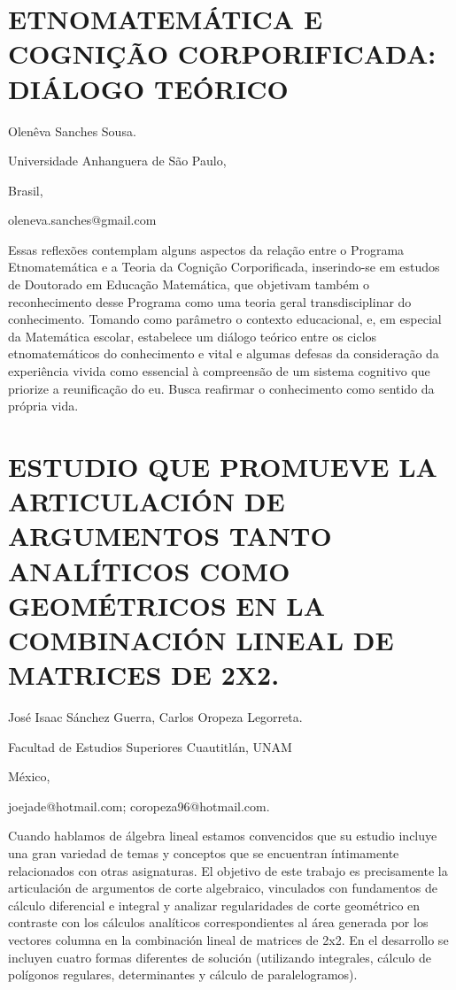 \section{ETNOMATEMÁTICA E COGNIÇÃO CORPORIFICADA: DIÁLOGO TEÓRICO}

\begin{datos}

Olenêva Sanches Sousa.

Universidade Anhanguera de São Paulo,

Brasil,

oleneva.sanches@gmail.com

\end{datos}

Essas reflexões contemplam alguns aspectos da relação entre o Programa
Etnomatemática e a Teoria da Cognição Corporificada, inserindo-se
em estudos de Doutorado em Educação Matemática, que objetivam também
o reconhecimento desse Programa como uma teoria geral transdisciplinar
do conhecimento. Tomando como parâmetro o contexto educacional, e,
em especial da Matemática escolar, estabelece um diálogo teórico entre
os ciclos etnomatemáticos do conhecimento e vital e algumas defesas
da consideração da experiência vivida como essencial à compreensão
de um sistema cognitivo que priorize a reunificação do eu. Busca reafirmar
o conhecimento como sentido da própria vida.


\section{ESTUDIO QUE PROMUEVE LA ARTICULACIÓN DE ARGUMENTOS TANTO ANALÍTICOS
COMO GEOMÉTRICOS EN LA COMBINACIÓN LINEAL DE MATRICES DE 2X2.}

\begin{datos}

José Isaac Sánchez Guerra, Carlos Oropeza Legorreta.

Facultad de Estudios Superiores Cuautitlán, UNAM

México,

joejade@hotmail.com; coropeza96@hotmail.com. 

\end{datos}

Cuando hablamos de álgebra lineal estamos convencidos que su estudio
incluye una gran variedad de temas y conceptos que se encuentran íntimamente
relacionados con otras asignaturas. El objetivo de este trabajo es
precisamente la articulación de argumentos de corte algebraico, vinculados
con fundamentos de cálculo diferencial e integral y analizar regularidades
de corte geométrico en contraste con los cálculos analíticos correspondientes
al área generada por los vectores columna en la combinación lineal
de matrices de 2x2. En el desarrollo se incluyen cuatro formas diferentes
de solución (utilizando integrales, cálculo de polígonos regulares,
determinantes y cálculo de paralelogramos).



